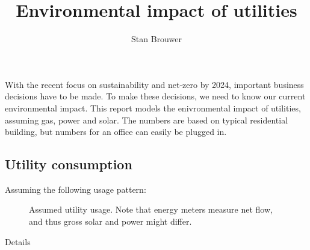 \documentclass[
  letterpaper,
  DIV=11,
  numbers=noendperiod]{scrartcl}
\title{Environmental impact of utilities}
\author{Stan Brouwer}
\date{}
\begin{document}
\maketitle

With the recent focus on sustainability and net-zero by 2024, important
business decisions have to be made. To make these decisions, we need to
know our current environmental impact. This report models the
enivronmental impact of utilities, assuming gas, power and solar. The
numbers are based on typical residential building, but numbers for an
office can easily be plugged in.

\subsection{Utility consumption}\label{utility-consumption}

Assuming the following usage pattern:

\label{cell-fig-utility}
\begin{figure}[H]


\caption{\label{fig-utility}Assumed utility usage. Note that energy
meters measure net flow, and thus gross solar and power might differ.}

\end{figure}%

Details
\end{document}
